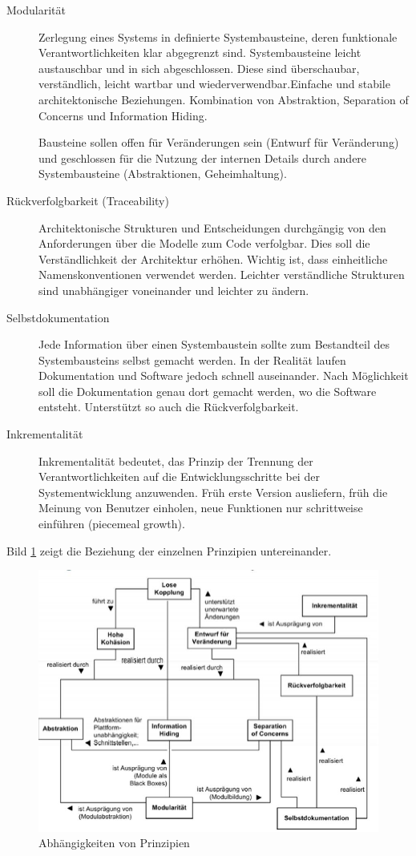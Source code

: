 \begin{description}
	\item[Modularität] Zerlegung eines Systems in definierte Systembausteine, deren funktionale Verantwortlichkeiten klar abgegrenzt sind. Systembausteine leicht austauschbar und in sich abgeschlossen. Diese sind überschaubar, verständlich, leicht wartbar und wiederverwendbar.Einfache und stabile architektonische Beziehungen. Kombination von Abstraktion, Separation of Concerns und Information Hiding.
	
	Bausteine sollen offen für Veränderungen sein (Entwurf für Veränderung) und geschlossen für die Nutzung der internen Details durch andere Systembausteine (Abstraktionen, Geheimhaltung).
	
	\item[Rückverfolgbarkeit (Traceability)] Architektonische Strukturen und Entscheidungen durchgängig von den Anforderungen über die Modelle zum Code verfolgbar. Dies soll die Verständlichkeit der Architektur erhöhen. Wichtig ist, dass einheitliche Namenskonventionen verwendet werden. Leichter verständliche Strukturen sind unabhängiger voneinander und leichter zu ändern.
	
	\item[Selbstdokumentation] Jede Information über einen Systembaustein sollte zum Bestandteil des Systembausteins selbst gemacht werden. In der Realität laufen Dokumentation und Software jedoch schnell auseinander. Nach Möglichkeit soll die Dokumentation genau dort gemacht werden, wo die Software entsteht. Unterstützt so auch die Rückverfolgbarkeit.
	
	\item[Inkrementalität] Inkrementalität bedeutet, das Prinzip der Trennung der Verantwortlichkeiten auf die Entwicklungsschritte bei der Systementwicklung anzuwenden. Früh erste Version ausliefern, früh die Meinung von Benutzer einholen, neue Funktionen nur schrittweise einführen (piecemeal growth).
	
\end{description}

Bild \ref{fig:abhangigkeiten-prinzipien} zeigt die Beziehung der einzelnen Prinzipien untereinander.

\begin{figure}[h!]
	\centering
	\includegraphics[width=0.6\linewidth]{fig/abhaengigkeiten-prinzipien}
	\caption{Abhängigkeiten von Prinzipien}
	\label{fig:abhangigkeiten-prinzipien}
\end{figure}

